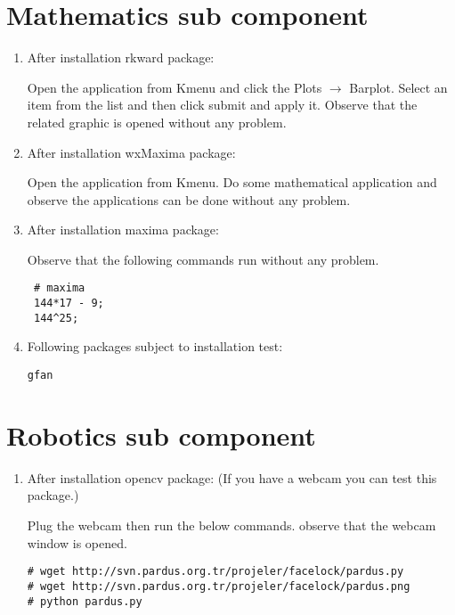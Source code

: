 \documentclass[a4paper,10pt]{article}
\begin{document}
\section{Mathematics sub component}
\begin{enumerate}
\item After installation rkward package:

Open the application from Kmenu and click the Plots $\rightarrow$ Barplot. Select an item from the list and then click submit and apply it. Observe that the related graphic is opened without any problem.

\item After installation wxMaxima package:

Open the application from Kmenu. Do some mathematical application and observe the applications can be done without any problem.

\item After installation maxima package:

Observe that the following commands run without any problem.
\begin{verbatim}
 # maxima
 144*17 - 9;
 144^25;
\end{verbatim}

\item Following packages subject to installation test:
\begin{verbatim}
gfan 
\end{verbatim}

\end{enumerate}

\section{Robotics sub component}
\begin{enumerate}
 \item After installation opencv package: 
(If you have a webcam you can test this package.)

Plug the webcam then run the below commands. observe that the webcam window is opened.
\begin{verbatim}
# wget http://svn.pardus.org.tr/projeler/facelock/pardus.py
# wget http://svn.pardus.org.tr/projeler/facelock/pardus.png
# python pardus.py
\end{verbatim}


\end{enumerate}
\end{document}
